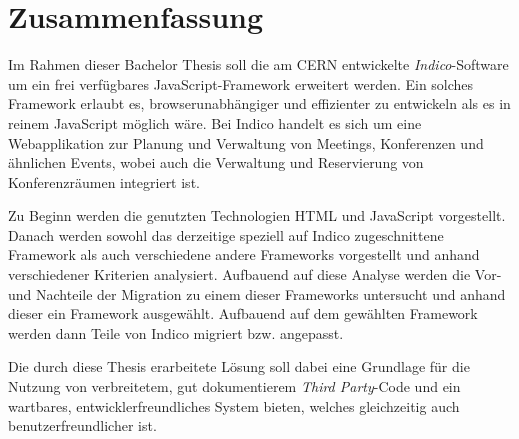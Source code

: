 \chapter*{Zusammenfassung}
\thispagestyle{empty}

Im Rahmen dieser Bachelor Thesis soll die am CERN entwickelte \emph{Indico}-Software um ein
frei verfügbares JavaScript-Framework erweitert werden. Ein solches Framework erlaubt es,
browserunabhängiger und effizienter zu entwickeln als es in reinem JavaScript möglich wäre. Bei
Indico handelt es sich um eine Webapplikation zur Planung und Verwaltung von Meetings, Konferenzen
und ähnlichen Events, wobei auch die Verwaltung und Reservierung von Konferenzräumen integriert ist.

Zu Beginn werden die genutzten Technologien HTML und JavaScript vorgestellt. Danach werden sowohl
das derzeitige speziell auf Indico zugeschnittene Framework als auch verschiedene andere Frameworks
vorgestellt und anhand verschiedener Kriterien analysiert. Aufbauend auf diese Analyse werden die
Vor- und Nachteile der Migration zu einem dieser Frameworks untersucht und anhand dieser ein
Framework ausgewählt. Aufbauend auf dem gewählten Framework werden dann Teile von Indico migriert
bzw. angepasst.

Die durch diese Thesis erarbeitete Lösung soll dabei eine Grundlage für die Nutzung von
verbreitetem, gut dokumentierem \emph{Third Party}-Code und ein wartbares, entwicklerfreundliches
System bieten, welches gleichzeitig auch benutzerfreundlicher ist.
